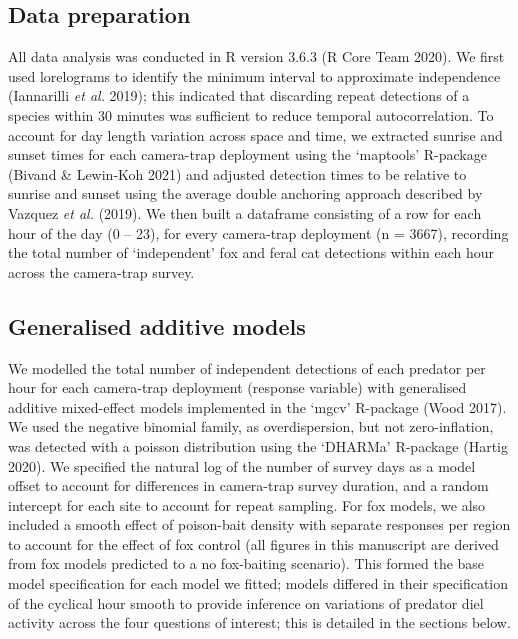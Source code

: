 \documentclass[]{elsarticle} %
\begin{document}
\hypertarget{data-preparation}{%
\subsection{Data preparation}\label{data-preparation}}

All data analysis was conducted in R version 3.6.3 (R Core Team 2020). We first used lorelograms to identify the minimum interval to approximate independence (Iannarilli \emph{et al.} 2019); this indicated that discarding repeat detections of a species within 30 minutes was sufficient to reduce temporal autocorrelation. To account for day length variation across space and time, we extracted sunrise and sunset times for each camera-trap deployment using the `maptools' R-package (Bivand \& Lewin-Koh 2021) and adjusted detection times to be relative to sunrise and sunset using the average double anchoring approach described by Vazquez \emph{et al.} (2019). We then built a dataframe consisting of a row for each hour of the day (0 -- 23), for every camera-trap deployment (n = 3667), recording the total number of `independent' fox and feral cat detections within each hour across the camera-trap survey.

\hypertarget{generalised-additive-models}{%
\subsection{Generalised additive models}\label{generalised-additive-models}}

We modelled the total number of independent detections of each predator per hour for each camera-trap deployment (response variable) with generalised additive mixed-effect models implemented in the `mgcv' R-package (Wood 2017). We used the negative binomial family, as overdispersion, but not zero-inflation, was detected with a poisson distribution using the `DHARMa' R-package (Hartig 2020). We specified the natural log of the number of survey days as a model offset to account for differences in camera-trap survey duration, and a random intercept for each site to account for repeat sampling. For fox models, we also included a smooth effect of poison-bait density with separate responses per region to account for the effect of fox control (all figures in this manuscript are derived from fox models predicted to a no fox-baiting scenario). This formed the base model specification for each model we fitted; models differed in their specification of the cyclical hour smooth to provide inference on variations of predator diel activity across the four questions of interest; this is detailed in the sections below.
\end{document}
